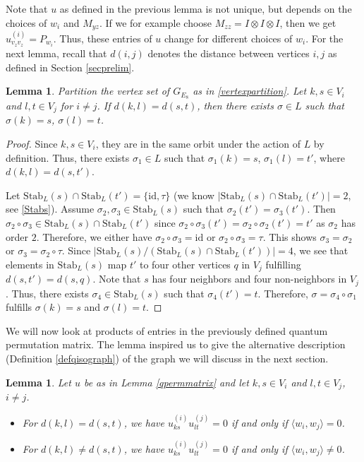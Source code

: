 \documentclass[11pt]{article}
\newtheorem{lemm}[theo]{Lemma}
\theoremstyle{definition}
\numberwithin{equation}{section}
\begin{document}
Note that $u$ as defined in the previous lemma is not unique, but depends on the choices of $w_i$ and $M_{yz}$. If we for example choose $M_{zz}=I\otimes I \otimes I$, then we get $u_{v_zv_z}^{(i)}=P_{w_i}$. Thus, these entries of $u$ change for different choices of $w_i$. 
For the next lemma, recall that $d(i,j)$ denotes the distance between vertices $i,j$ as defined in Section \ref{secprelim}. 

\begin{lemm}\label{edgepermutation}
Partition the vertex set of $G_{E_8}$ as in \eqref{vertexpartition}. Let $k,s \in V_i$ and $l,t \in V_j$ for $i\neq j$. If $d(k,l)=d(s,t)$, then there exists $\sigma \in L$ such that $\sigma(k)=s$, $\sigma(l)=t$.
\end{lemm}

\begin{proof}
Since $k,s \in V_i$, they are in the same orbit under the action of $L$ by definition. Thus, there exists $\sigma_1\in L$ such that $\sigma_1(k)=s$, $\sigma_1(l)=t'$, where $d(k,l)=d(s,t')$. 

Let $\mathrm{Stab}_L(s)\cap \mathrm{Stab}_L(t')=\{\mathrm{id}, \tau\}$ (we know $|\mathrm{Stab}_L(s)\cap \mathrm{Stab}_L(t')|=2$, see \eqref{Stabs}). Assume $\sigma_2, \sigma_3 \in \mathrm{Stab}_L(s)$ such that $\sigma_2(t')=\sigma_3(t')$. Then $\sigma_2\circ \sigma_3\in \mathrm{Stab}_L(s)\cap \mathrm{Stab}_L(t')$ since $\sigma_2\circ \sigma_3(t')=\sigma_2\circ \sigma_2(t')=t'$ as $\sigma_2$ has order $2$. Therefore, we either have $\sigma_2\circ \sigma_3=\mathrm{id}$ or $\sigma_2\circ \sigma_3=\tau$. This shows $\sigma_3=\sigma_2$ or $\sigma_3=\sigma_2\circ \tau$. Since $|\mathrm{Stab}_L(s)/(\mathrm{Stab}_L(s)\cap \mathrm{Stab}_L(t'))|=4$, we see that elements in $\mathrm{Stab}_L(s)$ map $t'$ to four other vertices $q$ in $V_j$ fulfilling $d(s,t')=d(s,q)$. Note that $s$ has four neighbors and four non-neighbors in $V_j$. Thus, there exists $\sigma_4\in \mathrm{Stab}_L(s)$ such that $\sigma_4(t')=t$. Therefore, $\sigma=\sigma_4 \circ \sigma_1$ fulfills $\sigma(k)=s$ and $\sigma(l)=t$.
\end{proof}

We will now look at products of entries in the previously defined quantum permutation matrix. The lemma inspired us to give the alternative description (Definition \ref{defqisograph}) of the graph we will discuss in the next section. 

\begin{lemm}\label{prod0}
Let $u$ be as in Lemma \ref{qpermmatrix} and let $k,s \in V_i$ and $l,t\in V_j$, $i \neq j$. 
\begin{itemize}
    \item[(i)] For $d(k,l)=d(s,t)$, we have $u_{ks}^{(i)}u_{lt}^{(j)}=0$ if and only if $\langle w_i,w_j\rangle=0$.
    \item[(ii)] For $d(k,l)\neq d(s,t)$, we have $u_{ks}^{(i)}u_{lt}^{(j)}=0$ if and only if $\langle w_i,w_j\rangle\neq0$.
\end{itemize}
\end{lemm}
\end{document}
